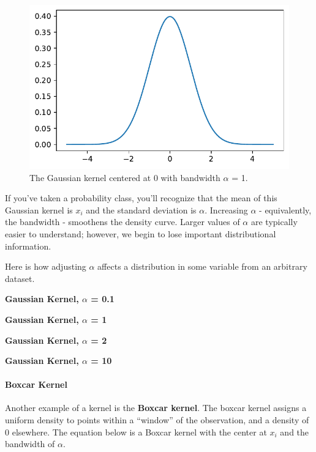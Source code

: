 \documentclass[
  letterpaper,
  DIV=11,
  numbers=noendperiod]{scrreprt}
\let\oldparagraph\paragraph
\renewcommand{\paragraph}[1]{\oldparagraph{#1}\mbox{}}
\begin{document}
\begin{figure}[H]

{\centering \includegraphics{visualization_2/visualization_2_files/figure-pdf/cell-5-output-1.pdf}

}

\caption{The Gaussian kernel centered at 0 with bandwidth \(\alpha\) =
1.}

\end{figure}

If you've taken a probability class, you'll recognize that the mean of
this Gaussian kernel is \(x_i\) and the standard deviation is
\(\alpha\). Increasing \(\alpha\) - equivalently, the bandwidth -
smoothens the density curve. Larger values of \(\alpha\) are typically
easier to understand; however, we begin to lose important distributional
information.

Here is how adjusting \(\alpha\) affects a distribution in some variable
from an arbitrary dataset.

\textbf{Gaussian Kernel, \(\alpha\) = 0.1}

\textbf{Gaussian Kernel, \(\alpha\) = 1}

\textbf{Gaussian Kernel, \(\alpha\) = 2}

\textbf{Gaussian Kernel, \(\alpha\) = 10}

\hypertarget{boxcar-kernel}{%
\paragraph{Boxcar Kernel}\label{boxcar-kernel}}

Another example of a kernel is the \textbf{Boxcar kernel}. The boxcar
kernel assigns a uniform density to points within a ``window'' of the
observation, and a density of 0 elsewhere. The equation below is a
Boxcar kernel with the center at \(x_i\) and the bandwidth of
\(\alpha\).
\end{document}
